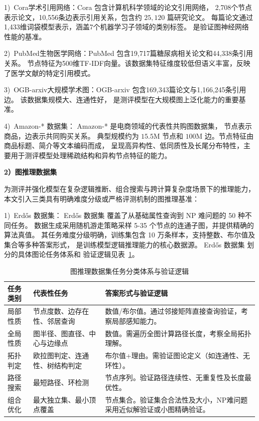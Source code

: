 {1)\ Cora学术引用网络}：Cora \cite{Hu2020OpenGB} 包含计算机科学领域的论文引用网络，
2,708个节点表示论文，10,556条边表示引用关系，包含约 $25{,}120$ 篇研究论文。
每篇论文通过1,433维词袋模型表示，涵盖7个机器学习子领域的类别标签。
是验证图神经网络性能的基准。

{2)\ PubMed生物医学网络}：PubMed \cite{Sen2008CollectiveCI}
包含19,717篇糖尿病相关论文和44,338条引用关系。
节点特征为500维TF-IDF向量。该数据集特征维度较低但语义丰富，反映了医学文献的特定引用模式。

{3)\ OGB-arxiv大规模学术图}：OGB-arxiv \cite{McCallum2000AutomatingTC} 
包含169,343篇论文与1,166,245条引用边。
该数据集规模大、连通性好，
是测评模型在大规模图上泛化能力的重要基准。

{4)\ Amazon-* 数据集}：
Amazon-* \cite{Wan2018ItemRO} 是电商领域的代表性共购图数据集，
节点表示商品，边表示共同购买关系。
典型规模约为 $15.5$M 节点和 $100$M 边。节点特征由商品标题、简介等文本编码而成，
呈现高异构性、低同质性及长尾分布特性，主要用于测评模型处理稀疏结构和异构节点特征的能力。

\textbf{2）图推理数据集}

为测评并强化模型在复杂逻辑推断、组合搜索与跨计算复杂度场景下的推理能力，
本文引入三类具有明确难度分级或严格评测机制的图推理基准：

{1)\ Erd\H{o}s 数据集}：
Erd\H{o}s 数据集 \cite{Guo2025G1TL} 
覆盖了从基础属性查询到 NP 难问题的 50 种不同任务。
数据生成采用随机游走策略采样 5-35 个节点的连通子图，并提供精确的算法真值。
其任务难度分级明确，训练集包含 10 万条样本，支持整数、布尔值及集合等多种答案形式，
是训练模型逻辑推理能力的核心数据源。
Erd\H{o}s 数据集 \cite{Guo2025G1TL} 划分的具体图论任务体系和
验证逻辑见表~\ref{tab:erdos_taxonomy}。

\begin{table}[htbp]
  \centering
  \caption{图推理数据集任务分类体系与验证逻辑}
  \label{tab:erdos_taxonomy}
  \renewcommand{\arraystretch}{1.3}
  \small 
  \begin{tabular}{p{}p{}p{}}
    \toprule
    \textbf{任务类别} & \textbf{代表性任务} & \textbf{答案形式与验证逻辑} \\
    \midrule
    {局部性质} & 节点度数、边存在性、邻居查询 & {数值/布尔值}。通过邻接矩阵直接查询验证，考察局部感知能力。 \\
    {全局性质} & 图半径、图直径、中心与边缘点 & {数值}。需遍历全图计算路径长度，考察全局拓扑理解。 \\
    {拓扑判定} & 欧拉图判定、连通性、树结构判定 & {布尔值+理由}。需验证图论定义（如连通性、无环性）。 \\
    {路径搜索} & 最短路径、环检测 & {节点序列}。验证路径连续性、无重复性及长度最优性。 \\
    {组合优化} & 最大独立集、最小顶点覆盖 & {节点集合}。验证集合合法性及大小，NP难问题采用近似解验证或小图精确验证。 \\
    \bottomrule
  \end{tabular}
\end{table}

